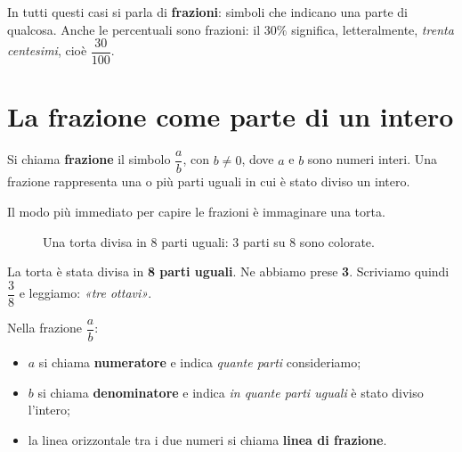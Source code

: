 In tutti questi casi si parla di \textbf{frazioni}: simboli che indicano una parte di qualcosa.
Anche le percentuali sono frazioni: il $30\%$ significa, letteralmente, \emph{trenta centesimi},
cioè $\dfrac{30}{100}$.

\section{La frazione come parte di un intero}

\begin{definizione}
    Si chiama \textbf{frazione} il simbolo $\dfrac{a}{b}$, con $b \neq 0$,
    dove $a$ e $b$ sono numeri interi.
    Una frazione rappresenta una o più parti uguali in cui è stato diviso un intero.
\end{definizione}

Il modo più immediato per capire le frazioni è immaginare una torta.

\begin{figure}[htb]
    \centering
    \caption{Una torta divisa in 8 parti uguali: 3 parti su 8 sono colorate.}
\end{figure}

La torta è stata divisa in \textbf{8 parti uguali}. Ne abbiamo prese \textbf{3}.
Scriviamo quindi $\dfrac{3}{8}$ e leggiamo: \emph{«tre ottavi»}.

\begin{definizione}
    Nella frazione $\dfrac{a}{b}$:
    \begin{itemize}[leftmargin=1.5em]
        \item $a$ si chiama \textbf{numeratore} e indica \emph{quante parti} consideriamo;
        \item $b$ si chiama \textbf{denominatore} e indica \emph{in quante parti uguali}
              è stato diviso l'intero;
        \item la linea orizzontale tra i due numeri si chiama \textbf{linea di frazione}.
    \end{itemize}
\end{definizione}

